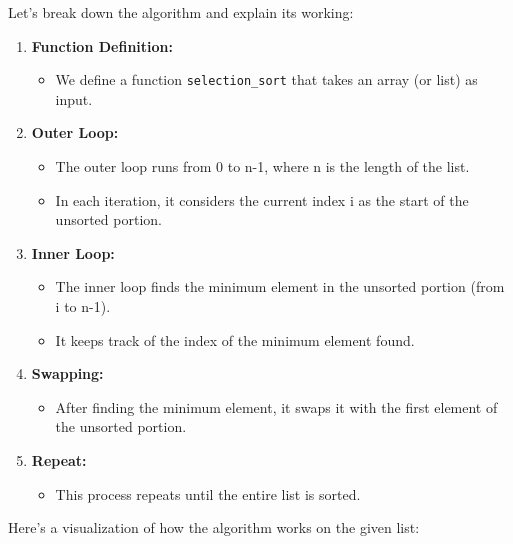 Let's break down the algorithm and explain its working:

\begin{enumerate}
\def\labelenumi{\arabic{enumi}.}
\tightlist
\item
  \textbf{Function Definition:}

  \begin{itemize}
  \tightlist
  \item
    We define a function \texttt{selection\_sort} that takes an array
    (or list) as input.
  \end{itemize}
\item
  \textbf{Outer Loop:}

  \begin{itemize}
  \tightlist
  \item
    The outer loop runs from 0 to n-1, where n is the length of the
    list.
  \item
    In each iteration, it considers the current index i as the start of
    the unsorted portion.
  \end{itemize}
\item
  \textbf{Inner Loop:}

  \begin{itemize}
  \tightlist
  \item
    The inner loop finds the minimum element in the unsorted portion
    (from i to n-1).
  \item
    It keeps track of the index of the minimum element found.
  \end{itemize}
\item
  \textbf{Swapping:}

  \begin{itemize}
  \tightlist
  \item
    After finding the minimum element, it swaps it with the first
    element of the unsorted portion.
  \end{itemize}
\item
  \textbf{Repeat:}

  \begin{itemize}
  \tightlist
  \item
    This process repeats until the entire list is sorted.
  \end{itemize}
\end{enumerate}

Here's a visualization of how the algorithm works on the given list:

